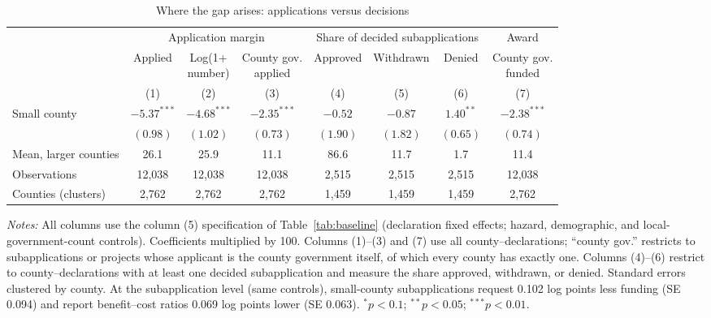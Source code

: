 \begin{table}[!htbp]
\centering
\footnotesize
\begin{threeparttable}
\caption{Where the gap arises: applications versus decisions}
\label{tab:pipeline}
\setlength{\tabcolsep}{3.5pt}
\begin{tabular}{@{}lccccccc@{}}
\toprule
 & \multicolumn{3}{c}{Application margin} & \multicolumn{3}{c}{Share of decided subapplications} & Award \\
\cmidrule(lr){2-4}\cmidrule(lr){5-7}\cmidrule(lr){8-8}
 & Applied & \shortstack{Log(1+\\number)} & \shortstack{County gov.\\applied} & Approved & Withdrawn & Denied & \shortstack{County gov.\\funded} \\
 & (1) & (2) & (3) & (4) & (5) & (6) & (7) \\
\midrule
Small county & $-5.37^{***}$ & $-4.68^{***}$ & $-2.35^{***}$ & $-0.52$ & $-0.87$ & $1.40^{**}$ & $-2.38^{***}$ \\
 & $(0.98)$ & $(1.02)$ & $(0.73)$ & $(1.90)$ & $(1.82)$ & $(0.65)$ & $(0.74)$ \\
Mean, larger counties & 26.1 & 25.9 & 11.1 & 86.6 & 11.7 & 1.7 & 11.4 \\
Observations & 12,038 & 12,038 & 12,038 & 2,515 & 2,515 & 2,515 & 12,038 \\
Counties (clusters) & 2,762 & 2,762 & 2,762 & 1,459 & 1,459 & 1,459 & 2,762 \\
\bottomrule
\end{tabular}
\begin{tablenotes}[flushleft]
\footnotesize
\item \textit{Notes:} All columns use the column (5) specification of Table~\ref{tab:baseline} (declaration fixed effects; hazard, demographic, and local-government-count controls). Coefficients multiplied by 100. Columns (1)--(3) and (7) use all county--declarations; ``county gov.'' restricts to subapplications or projects whose applicant is the county government itself, of which every county has exactly one. Columns (4)--(6) restrict to county--declarations with at least one decided subapplication and measure the share approved, withdrawn, or denied. Standard errors clustered by county. At the subapplication level (same controls), small-county subapplications request 0.102 log points less funding (SE 0.094) and report benefit--cost ratios 0.069 log points lower (SE 0.063). $^{*}p<0.1$; $^{**}p<0.05$; $^{***}p<0.01$.
\end{tablenotes}
\end{threeparttable}
\end{table}
